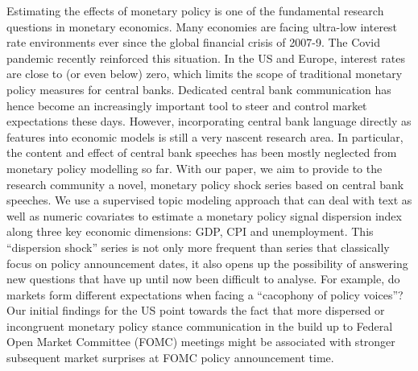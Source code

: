 Estimating the effects of monetary policy is one of the fundamental research questions in monetary economics. Many economies are facing ultra-low interest rate environments ever since the global financial crisis of 2007-9. The Covid pandemic recently reinforced this situation. In the US and Europe, interest rates are close to (or even below) zero, which limits the scope of traditional monetary policy measures for central banks. Dedicated central bank communication has hence become an increasingly important tool to steer and control market expectations these days. However, incorporating central bank language directly as features into economic models is still a very nascent research area. In particular, the content and effect of central bank speeches has been mostly neglected from monetary policy modelling so far. With our paper, we aim to provide to the research community a novel, monetary policy shock series based on central bank speeches. We use a supervised topic modeling approach that can deal with text as well as numeric covariates to estimate a monetary policy signal dispersion index along three key economic dimensions: GDP, CPI and unemployment. This ``dispersion shock'' series is not only more frequent than series that classically focus on policy announcement dates, it also opens up the possibility of answering new questions that have up until now been difficult to analyse. For example, do markets form different expectations when facing a ``cacophony of policy voices''? Our initial findings for the US point towards the fact that more dispersed or incongruent monetary policy stance communication in the build up to Federal Open Market Committee (FOMC) meetings might be associated with stronger subsequent market surprises at FOMC policy announcement time.
